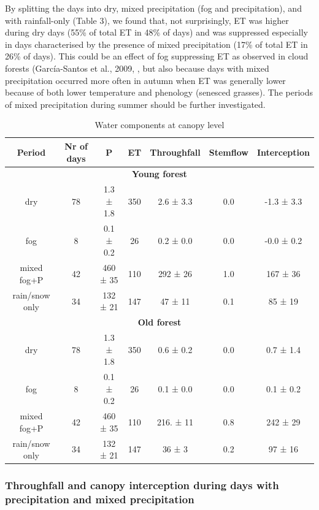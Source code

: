 \documentclass[10pt,letterpaper]{article}
\begin{document}
By splitting the days into dry, mixed precipitation (fog and precipitation), and with rainfall-only (Table 3), we found that, not surprisingly, ET was higher during dry days (55\% of total ET in 48\% of days) and was suppressed especially in days characterised by the presence of mixed precipitation (17\% of total ET in 26\% of days). This could be an effect of fog suppressing ET as observed in cloud forests (García-Santos et al., 2009, \cite{GarcaSantos2012}, but also because days with mixed precipitation occurred more often in autumn when ET was generally lower because of both lower temperature and phenology (senesced grasses). The periods of mixed precipitation during summer should be further investigated.

\begin{table}[!h]
\caption{Water components at canopy level}
\label{tab03}
   \centering
\setlength\tabcolsep{0pt}
\begin{tabular*}{\linewidth}{@{\extracolsep{\fill}} ccccccc }
\toprule
	\bf{Period} & \bf{Nr of days}  & \bf{P}  & \bf{ET}  & \bf{Throughfall} & \bf{Stemflow}  & \bf{Interception}  \\
\midrule
\multicolumn{7}{c}{\textbf{Young forest}} \\
\midrule
	dry & 78 & 1.3 ± 1.8 & 350 & 2.6 ± 3.3 & 0.0 & -1.3 ± 3.3 \\
	fog & 8 & 0.1 ± 0.2 & 26 & 0.2 ± 0.0 & 0.0 & -0.0 ± 0.2 \\
	mixed fog+P & 42 & 460 ± 35 & 110 & 292 ± 26  & 1.0 & 167 ± 36 \\
	rain/snow only & 34 & 132 ± 21 & 147 & 47 ± 11 & 0.1 & 85 ± 19 \\
\midrule
\multicolumn{7}{c}{\textbf{Old forest}} \\
\midrule
	dry & 78 & 1.3 ± 1.8 & 350 & 0.6 ± 0.2 & 0.0 & 0.7 ± 1.4 \\
	fog & 8 & 0.1 ± 0.2 & 26 & 0.1 ± 0.0 & 0.0 & 0.1 ± 0.2 \\
	mixed fog+P & 42 & 460 ± 35 & 110 & 216. ± 11 & 0.8 & 242 ± 29 \\
	rain/snow only & 34 & 132 ± 21 & 147 & 36 ± 3 & 0.2 & 97 ± 16 \\
\bottomrule
\end{tabular*}
\end{table} 

\subsubsection{Throughfall and canopy interception during days with precipitation and mixed precipitation}
\end{document}
